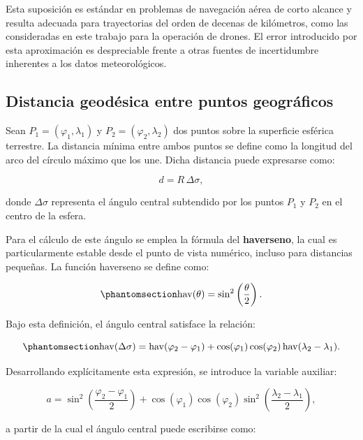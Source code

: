 \documentclass[
  spanish,
  us-letterpaper,
]{scrreprt}
\numberwithin{equation}{section}
\begin{document}
Esta suposición es estándar en problemas de navegación aérea de corto
alcance y resulta adecuada para trayectorias del orden de decenas de
kilómetros, como las consideradas en este trabajo para la operación de
drones. El error introducido por esta aproximación es despreciable
frente a otras fuentes de incertidumbre inherentes a los datos
meteorológicos.

\subsection{Distancia geodésica entre puntos
geográficos}\label{distancia-geoduxe9sica-entre-puntos-geogruxe1ficos}

Sean \(P_1 = (\varphi_1, \lambda_1)\) y \(P_2 = (\varphi_2, \lambda_2)\)
dos puntos sobre la superficie esférica terrestre. La distancia mínima
entre ambos puntos se define como la longitud del arco del círculo
máximo que los une. Dicha distancia puede expresarse como:

\[
d = R \, \Delta\sigma,
\]

donde \(\Delta\sigma\) representa el ángulo central subtendido por los
puntos \(P_1\) y \(P_2\) en el centro de la esfera.

Para el cálculo de este ángulo se emplea la fórmula del
\textbf{haverseno}, la cual es particularmente estable desde el punto de
vista numérico, incluso para distancias pequeñas. La función haverseno
se define como:

\begin{equation}\phantomsection\label{eq-haverseno}{
\operatorname{hav}(\theta) = \sin^2\left(\frac{\theta}{2}\right). 
}\end{equation}

Bajo esta definición, el ángulo central satisface la relación:

\begin{equation}\phantomsection\label{eq-angulocentral}{
\operatorname{hav}(\Delta\sigma) = \operatorname{hav}(\varphi_2 - \varphi_1) + \cos(\varphi_1)\cos(\varphi_2)\operatorname{hav}(\lambda_2 - \lambda_1). 
}\end{equation}

Desarrollando explícitamente esta expresión, se introduce la variable
auxiliar:

\[
a = \sin^2\left(\frac{\varphi_2 - \varphi_1}{2}\right) + \cos(\varphi_1)\cos(\varphi_2) \sin^2\left(\frac{\lambda_2 - \lambda_1}{2}\right),
\]

a partir de la cual el ángulo central puede escribirse como:
\end{document}
